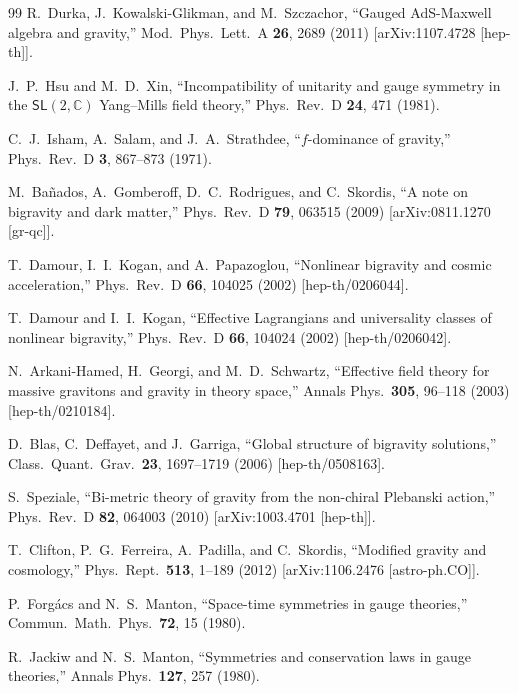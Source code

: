 \documentclass[11pt, a4paper]{article}
\begin{document}
\begin{thebibliography}{99}
  R.~Durka, J.~Kowalski-Glikman, and M.~Szczachor,
  ``Gauged AdS-Maxwell algebra and gravity,''
  Mod.\ Phys.\ Lett.\ A \textbf{26}, 2689 (2011) [arXiv:1107.4728 [hep-th]].

  J.~P.~Hsu and M.~D.~Xin,
  ``Incompatibility of unitarity and gauge symmetry in the $\mathsf{SL}(2,\mathbb{C})$ Yang--Mills field theory,''
  Phys.\ Rev.\ D \textbf{24}, 471 (1981).

  C.~J.~Isham, A.~Salam, and J.~A.~Strathdee,
  ``$f$-dominance of gravity,''
  Phys.\ Rev.\ D \textbf{3}, 867--873 (1971).

  M.~Ba\~nados, A.~Gomberoff, D.~C.~Rodrigues, and C.~Skordis,
  ``A note on bigravity and dark matter,''
  Phys.\ Rev.\ D \textbf{79}, 063515 (2009) [arXiv:0811.1270 [gr-qc]].

  T.~Damour, I.~I.~Kogan, and A.~Papazoglou,
  ``Nonlinear bigravity and cosmic acceleration,''
  Phys.\ Rev.\ D \textbf{66}, 104025 (2002) [hep-th/0206044].

  T.~Damour and I.~I.~Kogan,
  ``Effective Lagrangians and universality classes of nonlinear bigravity,''
  Phys.\ Rev.\ D \textbf{66}, 104024 (2002) [hep-th/0206042].

  N.~Arkani-Hamed, H.~Georgi, and M.~D.~Schwartz,
  ``Effective field theory for massive gravitons and gravity in theory space,''
  Annals Phys.\ \textbf{305}, 96--118 (2003) [hep-th/0210184].

  D.~Blas, C.~Deffayet, and J.~Garriga,
  ``Global structure of bigravity solutions,''
  Class.\ Quant.\ Grav.\ \textbf{23}, 1697--1719 (2006) [hep-th/0508163].

  S.~Speziale,
  ``Bi-metric theory of gravity from the non-chiral Plebanski action,''
  Phys.\ Rev.\ D \textbf{82}, 064003 (2010) [arXiv:1003.4701 [hep-th]].

  T.~Clifton, P.~G.~Ferreira, A.~Padilla, and C.~Skordis,
  ``Modified gravity and cosmology,''
  Phys.\ Rept.\ \textbf{513}, 1--189 (2012) [arXiv:1106.2476 [astro-ph.CO]].

  P.~Forg\'acs and N.~S.~Manton,
  ``Space-time symmetries in gauge theories,''
  Commun.\ Math.\ Phys.\ \textbf{72}, 15 (1980).

  R.~Jackiw and N.~S.~Manton,
  ``Symmetries and conservation laws in gauge theories,''
  Annals Phys.\ \textbf{127}, 257 (1980).

\end{thebibliography}
\end{document}
